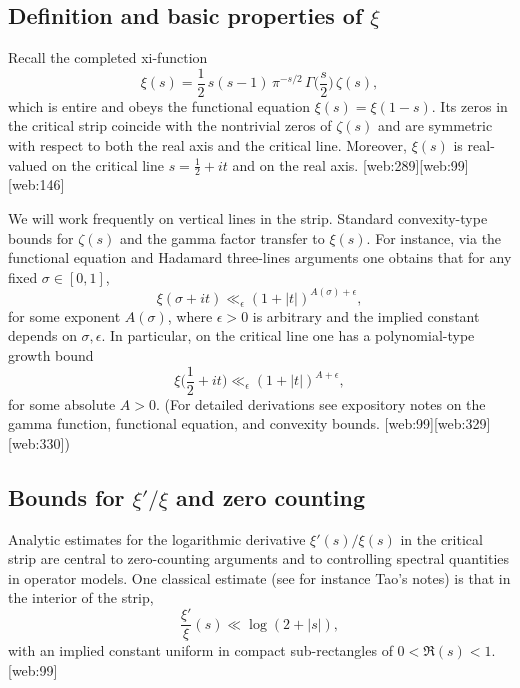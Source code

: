 \documentclass[11pt]{article}
\begin{document}
\subsection{Definition and basic properties of $\xi$}

Recall the completed xi-function
\begin{equation}
  \xi(s) = \frac12\,s(s-1)\,\pi^{-s/2}\,\Gamma\!\Big(\frac{s}{2}\Big)\,\zeta(s),
\end{equation}
which is entire and obeys the functional equation $\xi(s)=\xi(1-s)$.  Its zeros in the critical strip coincide with the nontrivial zeros of $\zeta(s)$ and are symmetric with respect to both the real axis and the critical line.  Moreover, $\xi(s)$ is real-valued on the critical line $s=\tfrac12+it$ and on the real axis. [web:289][web:99][web:146]

We will work frequently on vertical lines in the strip.  Standard convexity-type bounds for $\zeta(s)$ and the gamma factor transfer to $\xi(s)$.  For instance, via the functional equation and Hadamard three-lines arguments one obtains that for any fixed $\sigma\in[0,1]$,
\begin{equation}\label{eq:xi-growth}
  \xi(\sigma+it) \ll_\epsilon (1+|t|)^{A(\sigma)+\epsilon},
\end{equation}
for some exponent $A(\sigma)$, where $\epsilon>0$ is arbitrary and the implied constant depends on $\sigma,\epsilon$.  In particular, on the critical line one has a polynomial-type growth bound
\begin{equation}
  \xi\Big(\frac12+it\Big) \ll_\epsilon (1+|t|)^{A+\epsilon},
\end{equation}
for some absolute $A>0$.  (For detailed derivations see expository notes on the gamma function, functional equation, and convexity bounds. [web:99][web:329][web:330])

\subsection{Bounds for $\xi'/\xi$ and zero counting}

Analytic estimates for the logarithmic derivative $\xi'(s)/\xi(s)$ in the critical strip are central to zero-counting arguments and to controlling spectral quantities in operator models.  One classical estimate (see for instance Tao's notes) is that in the interior of the strip,
\begin{equation}
  \frac{\xi'}{\xi}(s) \ll \log(2+|s|),
\end{equation}
with an implied constant uniform in compact sub-rectangles of $0<\Re(s)<1$. [web:99]
\end{document}
